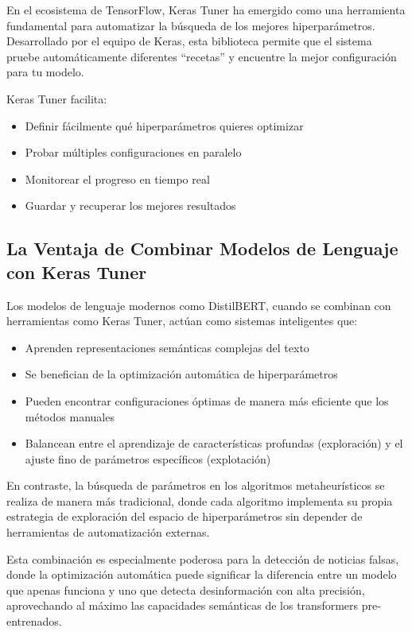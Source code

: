 En el ecosistema de TensorFlow, Keras Tuner \cite{omalley2020hyperparameter} ha emergido como una herramienta fundamental para automatizar la búsqueda de los mejores hiperparámetros. Desarrollado por el equipo de Keras, esta biblioteca permite que el sistema pruebe automáticamente diferentes ``recetas'' y encuentre la mejor configuración para tu modelo.

Keras Tuner facilita:
\begin{itemize}
    \item Definir fácilmente qué hiperparámetros quieres optimizar
    \item Probar múltiples configuraciones en paralelo
    \item Monitorear el progreso en tiempo real
    \item Guardar y recuperar los mejores resultados
\end{itemize}

\subsection{La Ventaja de Combinar Modelos de Lenguaje con Keras Tuner}

Los modelos de lenguaje modernos como DistilBERT, cuando se combinan con herramientas como Keras Tuner, actúan como sistemas inteligentes que:

\begin{itemize}
    \item Aprenden representaciones semánticas complejas del texto
    \item Se benefician de la optimización automática de hiperparámetros
    \item Pueden encontrar configuraciones óptimas de manera más eficiente que los métodos manuales
    \item Balancean entre el aprendizaje de características profundas (exploración) y el ajuste fino de parámetros específicos (explotación)
\end{itemize}

En contraste, la búsqueda de parámetros en los algoritmos metaheurísticos se realiza de manera más tradicional, donde cada algoritmo implementa su propia estrategia de exploración del espacio de hiperparámetros sin depender de herramientas de automatización externas.

Esta combinación es especialmente poderosa para la detección de noticias falsas, donde la optimización automática puede significar la diferencia entre un modelo que apenas funciona y uno que detecta desinformación con alta precisión, aprovechando al máximo las capacidades semánticas de los transformers pre-entrenados.

